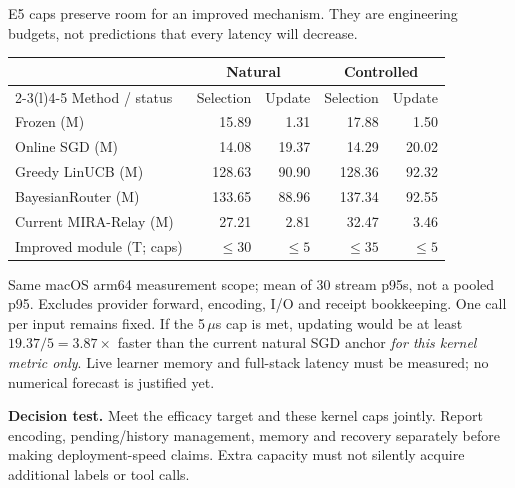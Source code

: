 \documentclass[10pt,letterpaper]{article}
\newcommand{\T}[1]{{\color{GuideBlue}#1}}
\newcommand{\note}[1]{{\fontsize{8.5}{10.5}\selectfont #1\par}}
\newcommand{\sectionhead}[1]{\vspace{7pt}{\large\bfseries #1}\par\vspace{3pt}}
\newenvironment{clean}{\begin{center}\fontsize{9.5}{11.5}\selectfont\setlength{\tabcolsep}{8pt}\renewcommand{\arraystretch}{1.10}}{\end{center}}
\begin{document}
\newpage
\sectionhead{4. Retain efficiency while adding useful capacity}
E5 caps preserve room for an improved mechanism. They are engineering budgets, not predictions that every latency will decrease.
\begin{minipage}{\linewidth}\end{minipage}
\begin{clean}
\begin{tabular}{@{}lrrrr@{}}
\toprule
& \multicolumn{2}{c}{Natural} & \multicolumn{2}{c}{Controlled} \\
\cmidrule(lr){2-3}\cmidrule(l){4-5}
Method / status & Selection & Update & Selection & Update \\
\midrule
Frozen (M) & 15.89 & 1.31 & 17.88 & 1.50 \\
Online SGD (M) & 14.08 & 19.37 & 14.29 & 20.02 \\
Greedy LinUCB (M) & 128.63 & 90.90 & 128.36 & 92.32 \\
BayesianRouter (M) & 133.65 & 88.96 & 137.34 & 92.55 \\
Current MIRA-Relay (M) & 27.21 & 2.81 & 32.47 & 3.46 \\
\midrule
\T{Improved module (T; caps)} & \T{$\leq30$} & \T{$\leq5$} & \T{$\leq35$} & \T{$\leq5$} \\

\bottomrule
\end{tabular}
\end{clean}
\note{Same macOS arm64 measurement scope; mean of 30 stream p95s, not a pooled p95. Excludes provider forward, encoding, I/O and receipt bookkeeping. One call per input remains fixed. If the 5\,$\mu$s cap is met, updating would be at least $19.37/5=3.87\times$ faster than the current natural SGD anchor \emph{for this kernel metric only}. Live learner memory and full-stack latency must be measured; no numerical forecast is justified yet.}
\textbf{Decision test.} Meet the efficacy target and these kernel caps jointly. Report encoding, pending/history management, memory and recovery separately before making deployment-speed claims. Extra capacity must not silently acquire additional labels or tool calls.
\end{document}
